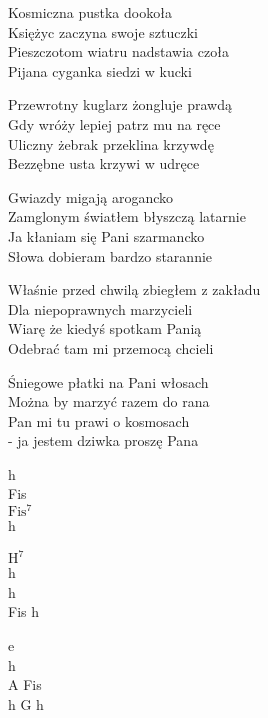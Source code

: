 \begin{text}
    Kosmiczna pustka dookoła\\
    Księżyc zaczyna swoje sztuczki\\
    Pieszczotom wiatru nadstawia czoła\\
    Pijana cyganka siedzi w kucki

    Przewrotny kuglarz żongluje prawdą\\
    Gdy wróży lepiej patrz mu na ręce\\
    Uliczny żebrak przeklina krzywdę\\
    Bezzębne usta krzywi w udręce

    \vin Gwiazdy migają arogancko\\
    \vin Zamglonym światłem błyszczą latarnie\\
    \vin Ja kłaniam się Pani szarmancko\\
    \vin Słowa dobieram bardzo starannie

    Właśnie przed chwilą zbiegłem z zakładu\\
    Dla niepoprawnych marzycieli\\
    Wiarę że kiedyś spotkam Panią\\
    Odebrać tam mi przemocą chcieli

    Śniegowe płatki na Pani włosach\\
    Można by marzyć razem do rana\\
    Pan mi tu prawi o kosmosach\\
    - ja jestem dziwka proszę Pana
\end{text}
\begin{chord}
    h\\
    Fis\\
    $\mathrm{Fis^{7}}$\\
    h

    $\mathrm{H^{7}}$\\
    h\\
    h\\
    Fis h

    e\\
    h\\
    A Fis\\
    h G h
\end{chord}
